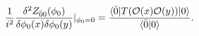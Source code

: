 \begin{equation}
\frac{1}{i^2} \frac{\delta ^2 Z_{\bar{0} 0} (\phi_0) } {\delta \phi_0 (x) \delta \phi_0 (y) } |_{\phi_0=0} = \frac{\langle \bar{0} | T({\cal
O}(x) {\cal O} (y) ) | 0 \rangle }{\langle \bar{0} | 0 \rangle } .
\end{equation}

